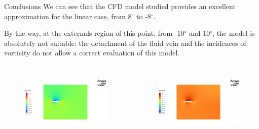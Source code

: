\documentclass[english,10pt,a4paper,twoside]{beamer}
\begin{document}
	\begin{frame}{Conclusions}
		We can see that the CFD model studied provides an excellent approximation for the linear case, from 8$^\circ$ to -8$^\circ$.
		
		By the way, at the externals region of this point, from -10$^\circ$ and 10$^\circ$, the model is absolutely not suitable: the detachment of the fluid vein and the incidences of vorticity do not allow a correct evaluation of this model. 
		\begin{columns}
			\begin{figure}[H]
				\centering
				\includegraphics[width=1.1\linewidth]{figures/SYS.1-85-00902}
				\label{fig:sys}
			\end{figure}
			
			\begin{figure}[H]
				\centering
				\includegraphics[width=1.1\linewidth]{figures/SYS.1-85-00903}
				\label{fig:sys.2}
			\end{figure}			
		\end{columns}		
	\end{frame}
	
\end{document}
